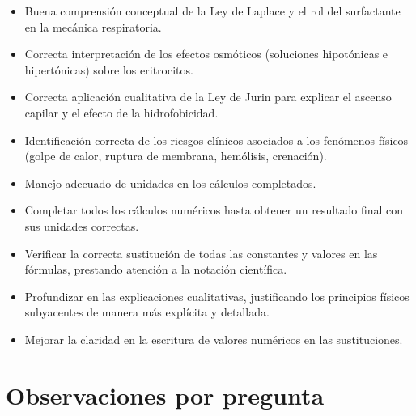 \documentclass[11pt,a4paper]{article}
\begin{document}
\vspace{4pt}
\begin{minipage}[t]{0.48\linewidth}
  \begin{tcolorbox}[cajaFortaleza, title={Fortalezas}]
\begin{itemize}[leftmargin=1.5em, itemsep=2pt]
  \item Buena comprensión conceptual de la Ley de Laplace y el rol del surfactante en la mecánica respiratoria.
  \item Correcta interpretación de los efectos osmóticos (soluciones hipotónicas e hipertónicas) sobre los eritrocitos.
  \item Correcta aplicación cualitativa de la Ley de Jurin para explicar el ascenso capilar y el efecto de la hidrofobicidad.
  \item Identificación correcta de los riesgos clínicos asociados a los fenómenos físicos (golpe de calor, ruptura de membrana, hemólisis, crenación).
  \item Manejo adecuado de unidades en los cálculos completados.
\end{itemize}
  \end{tcolorbox}
\end{minipage}
\hfill
\begin{minipage}[t]{0.48\linewidth}
  \begin{tcolorbox}[cajaMejora, title={Areas de mejora}]
\begin{itemize}[leftmargin=1.5em, itemsep=2pt]
  \item Completar todos los cálculos numéricos hasta obtener un resultado final con sus unidades correctas.
  \item Verificar la correcta sustitución de todas las constantes y valores en las fórmulas, prestando atención a la notación científica.
  \item Profundizar en las explicaciones cualitativas, justificando los principios físicos subyacentes de manera más explícita y detallada.
  \item Mejorar la claridad en la escritura de valores numéricos en las sustituciones.
\end{itemize}
  \end{tcolorbox}
\end{minipage}

\section*{Observaciones por pregunta}
\end{document}
